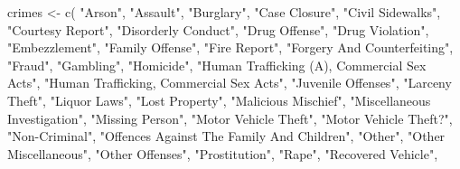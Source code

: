 \documentclass[
]{krantz}
\makeatletter
\newenvironment{Shaded}{\begin{snugshade}}{\end{snugshade}}
\newcommand{\FunctionTok}[1]{\textcolor[rgb]{0,0,0}{#1}}
\newcommand{\NormalTok}[1]{#1}
\newcommand{\OtherTok}[1]{\textcolor[rgb]{0.37,0.37,0.37}{#1}}
\newcommand{\StringTok}[1]{\textcolor[rgb]{0.5,0.5,0.5}{#1}}
\newenvironment{kframe}{%
\medskip{}
\setlength{\fboxsep}{.8em}
 \def\at@end@of@kframe{}%
 \ifinner\ifhmode%
  \def\at@end@of@kframe{\end{minipage}}%
  \begin{minipage}{\columnwidth}%
 \fi\fi%
 \def\FrameCommand##1{\hskip\@totalleftmargin \hskip-\fboxsep
 \colorbox{shadecolor}{##1}\hskip-\fboxsep
     \hskip-\linewidth \hskip-\@totalleftmargin \hskip\columnwidth}%
 \MakeFramed {\advance\hsize-\width
   \@totalleftmargin\z@ \linewidth\hsize
   \@setminipage}}%
 {\par\unskip\endMakeFramed%
 \at@end@of@kframe}
\renewenvironment{Shaded}{\begin{kframe}}{\end{kframe}}
\makeatother
\begin{document}
\begin{Shaded}
\begin{Highlighting}[]
\NormalTok{crimes }\OtherTok{\textless{}{-}} \FunctionTok{c}\NormalTok{(}
  \StringTok{"Arson"}\NormalTok{,}
  \StringTok{"Assault"}\NormalTok{,                                  }
  \StringTok{"Burglary"}\NormalTok{,                                 }
  \StringTok{"Case Closure"}\NormalTok{,                             }
  \StringTok{"Civil Sidewalks"}\NormalTok{,                          }
  \StringTok{"Courtesy Report"}\NormalTok{,                          }
  \StringTok{"Disorderly Conduct"}\NormalTok{,                       }
  \StringTok{"Drug Offense"}\NormalTok{,                             }
  \StringTok{"Drug Violation"}\NormalTok{,                           }
  \StringTok{"Embezzlement"}\NormalTok{,                             }
  \StringTok{"Family Offense"}\NormalTok{,                           }
  \StringTok{"Fire Report"}\NormalTok{,                              }
  \StringTok{"Forgery And Counterfeiting"}\NormalTok{,               }
  \StringTok{"Fraud"}\NormalTok{,                                    }
  \StringTok{"Gambling"}\NormalTok{,                                 }
  \StringTok{"Homicide"}\NormalTok{,                                 }
  \StringTok{"Human Trafficking (A), Commercial Sex Acts"}\NormalTok{,}
  \StringTok{"Human Trafficking, Commercial Sex Acts"}\NormalTok{,   }
  \StringTok{"Juvenile Offenses"}\NormalTok{,                        }
  \StringTok{"Larceny Theft"}\NormalTok{,                            }
  \StringTok{"Liquor Laws"}\NormalTok{,                              }
  \StringTok{"Lost Property"}\NormalTok{,                            }
  \StringTok{"Malicious Mischief"}\NormalTok{,                       }
  \StringTok{"Miscellaneous Investigation"}\NormalTok{,              }
  \StringTok{"Missing Person"}\NormalTok{,                           }
  \StringTok{"Motor Vehicle Theft"}\NormalTok{,                      }
  \StringTok{"Motor Vehicle Theft?"}\NormalTok{,                     }
  \StringTok{"Non{-}Criminal"}\NormalTok{,                             }
  \StringTok{"Offences Against The Family And Children"}\NormalTok{, }
  \StringTok{"Other"}\NormalTok{,                                    }
  \StringTok{"Other Miscellaneous"}\NormalTok{,                      }
  \StringTok{"Other Offenses"}\NormalTok{,                           }
  \StringTok{"Prostitution"}\NormalTok{,                             }
  \StringTok{"Rape"}\NormalTok{,                                     }
  \StringTok{"Recovered Vehicle"}\NormalTok{,                        }

\end{Highlighting}
\end{Shaded}
\end{document}
